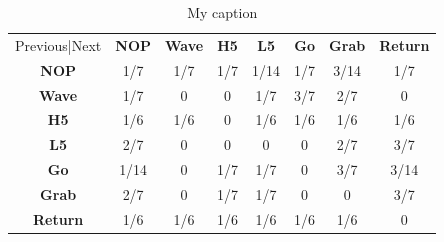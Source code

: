 \begin{table}[]
\centering
\begin{tabular}{cccccccc}
Previous|Next                        & \textbf{NOP} & \textbf{Wave} & \textbf{H5} & \textbf{L5} & \textbf{Go} & \textbf{Grab} & \textbf{Return} \\ \cline{2-8} 
\multicolumn{1}{c|}{\textbf{NOP}}    & 1/7          & 1/7           & 1/7         & 1/14        & 1/7         & 3/14          & 1/7             \\
\multicolumn{1}{c|}{\textbf{Wave}}   & 1/7          & 0             & 0           & 1/7         & 3/7         & 2/7           & 0               \\
\multicolumn{1}{c|}{\textbf{H5}}     & 1/6          & 1/6           & 0           & 1/6         & 1/6         & 1/6           & 1/6             \\
\multicolumn{1}{c|}{\textbf{L5}}     & 2/7          & 0             & 0           & 0           & 0           & 2/7           & 3/7             \\
\multicolumn{1}{c|}{\textbf{Go}}     & 1/14         & 0             & 1/7         & 1/7         & 0           & 3/7           & 3/14            \\
\multicolumn{1}{c|}{\textbf{Grab}}   & 2/7          & 0             & 1/7         & 1/7         & 0           & 0             & 3/7             \\
\multicolumn{1}{c|}{\textbf{Return}} & 1/6          & 1/6           & 1/6         & 1/6         & 1/6         & 1/6           & 0              
\end{tabular}
\caption{My caption}
\label{my-label}
\end{table}

